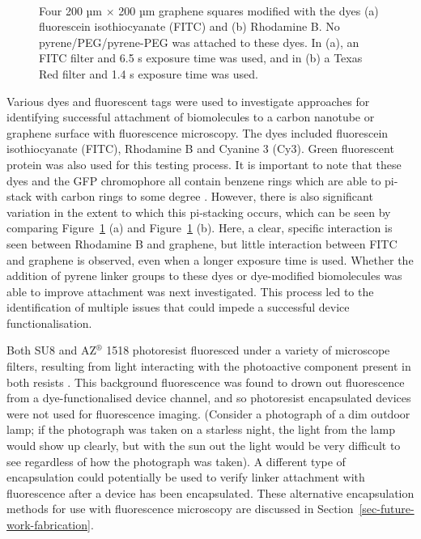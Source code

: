 \documentclass[
  a4paper,
]{scrbook}
\begin{document}
\begin{figure}
\begin{minipage}[t]{0.45\linewidth}
{{}

}

\end{minipage}%
%
\begin{minipage}[t]{0.01\linewidth}

{\centering 

~

}

\end{minipage}%

\caption[Four 200 µm \(\times\) 200 µm graphene squares modified with
the dyes fluorescein isothiocyanate (FITC) and Rhodamine
B.]{\label{fig-FITC-rhodamine-B}Four 200 µm \(\times\) 200 µm graphene
squares modified with the dyes (a) fluorescein isothiocyanate (FITC) and
(b) Rhodamine B. No pyrene/PEG/pyrene-PEG was attached to these dyes. In
(a), an FITC filter and 6.5 s exposure time was used, and in (b) a Texas
Red filter and 1.4 s exposure time was used.}

\end{figure}

Various dyes and fluorescent tags were used to investigate approaches
for identifying successful attachment of biomolecules to a carbon
nanotube or graphene surface with fluorescence microscopy. The dyes
included fluorescein isothiocyanate (FITC), Rhodamine B and Cyanine 3
(Cy3). Green fluorescent protein was also used for this testing process.
It is important to note that these dyes and the GFP chromophore all
contain benzene rings which are able to pi-stack with carbon rings to
some degree
\autocite{Nakayama-Ratchford2007,Tang2012,Khrenova2019,Qiu2019}.
However, there is also significant variation in the extent to which this
pi-stacking occurs, which can be seen by comparing
Figure~\ref{fig-FITC-rhodamine-B} (a) and
Figure~\ref{fig-FITC-rhodamine-B} (b). Here, a clear, specific
interaction is seen between Rhodamine B and graphene, but little
interaction between FITC and graphene is observed, even when a longer
exposure time is used. Whether the addition of pyrene linker groups to
these dyes or dye-modified biomolecules was able to improve attachment
was next investigated. This process led to the identification of
multiple issues that could impede a successful device functionalisation.

Both SU8 and AZ\(^\circledR\) 1518 photoresist fluoresced under a
variety of microscope filters, resulting from light interacting with the
photoactive component present in both resists \autocite{Pai2007}. This
background fluorescence was found to drown out fluorescence from a
dye-functionalised device channel, and so photoresist encapsulated
devices were not used for fluorescence imaging. (Consider a photograph
of a dim outdoor lamp; if the photograph was taken on a starless night,
the light from the lamp would show up clearly, but with the sun out the
light would be very difficult to see regardless of how the photograph
was taken). A different type of encapsulation could potentially be used
to verify linker attachment with fluorescence after a device has been
encapsulated. These alternative encapsulation methods for use with
fluorescence microscopy are discussed in
Section~\ref{sec-future-work-fabrication}.
\end{document}
